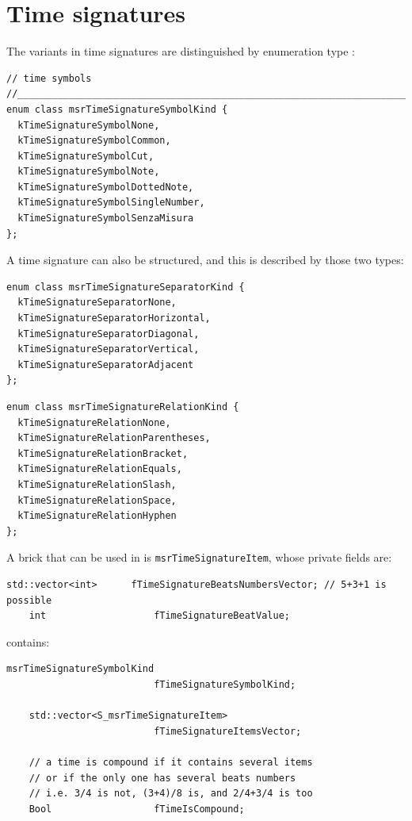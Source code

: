 \section{Time signatures}\label{Time signatures}

The variants in time signatures are distinguished by enumeration type :
\begin{lstlisting}[language=CPlusPlus]
// time symbols
//______________________________________________________________________________
enum class msrTimeSignatureSymbolKind {
  kTimeSignatureSymbolNone,
  kTimeSignatureSymbolCommon,
  kTimeSignatureSymbolCut,
  kTimeSignatureSymbolNote,
  kTimeSignatureSymbolDottedNote,
  kTimeSignatureSymbolSingleNumber,
  kTimeSignatureSymbolSenzaMisura
};
\end{lstlisting}

A time signature can also be structured, and this is described by those two types:
\begin{lstlisting}[language=CPlusPlus]
enum class msrTimeSignatureSeparatorKind {
  kTimeSignatureSeparatorNone,
  kTimeSignatureSeparatorHorizontal,
  kTimeSignatureSeparatorDiagonal,
  kTimeSignatureSeparatorVertical,
  kTimeSignatureSeparatorAdjacent
};
\end{lstlisting}

\begin{lstlisting}[language=CPlusPlus]
enum class msrTimeSignatureRelationKind {
  kTimeSignatureRelationNone,
  kTimeSignatureRelationParentheses,
  kTimeSignatureRelationBracket,
  kTimeSignatureRelationEquals,
  kTimeSignatureRelationSlash,
  kTimeSignatureRelationSpace,
  kTimeSignatureRelationHyphen
};
\end{lstlisting}

A brick that can be used in  is {\tt msrTimeSignatureItem}, whose private fields are:
\begin{lstlisting}[language=CPlusPlus]
    std::vector<int>      fTimeSignatureBeatsNumbersVector; // 5+3+1 is possible
    int                   fTimeSignatureBeatValue;
\end{lstlisting}

 contains:
\begin{lstlisting}[language=CPlusPlus]
    msrTimeSignatureSymbolKind
                          fTimeSignatureSymbolKind;

    std::vector<S_msrTimeSignatureItem>
                          fTimeSignatureItemsVector;

    // a time is compound if it contains several items
    // or if the only one has several beats numbers
    // i.e. 3/4 is not, (3+4)/8 is, and 2/4+3/4 is too
    Bool                  fTimeIsCompound;
\end{lstlisting}


